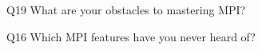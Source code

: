 \begin{description}%
\item{Q19} What are your obstacles to mastering MPI?%
\item{Q16} Which MPI features have you never heard of?%
\end{description}%
